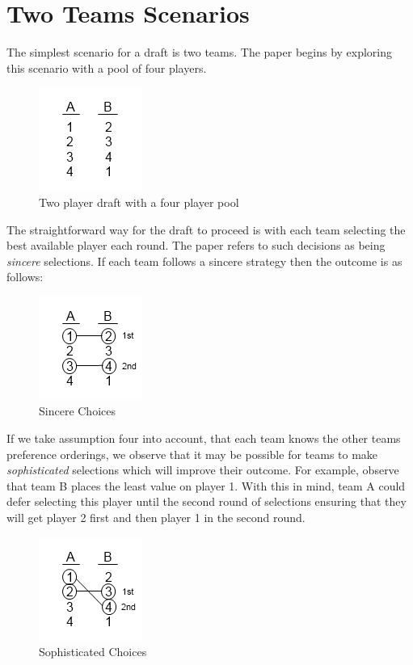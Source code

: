 \documentclass{article}
\begin{document}
\section{Two Teams Scenarios}

The simplest scenario for a draft is two teams. The paper begins by exploring this scenario with a pool of four players. 

\begin{figure}[H]
	\centering
	\includegraphics[scale=1.0]{TwoTeams}
	\caption{Two player draft with a four player pool}
\end{figure}

The straightforward way for the draft to proceed is with each team selecting the best available player each round. The paper refers to such decisions as being {\em sincere} selections. If each team follows a sincere strategy then the outcome is as follows:

\begin{figure}[H]
	\centering
	\includegraphics[scale=1.0]{TwoTeamsSincere}
	\caption{Sincere Choices}
\end{figure}

If we take assumption four into account, that each team knows the other teams preference orderings, we observe that it may be possible for teams to make {\em sophisticated} selections which will improve their outcome. For example, observe that team B places the least value on player 1. With this in mind, team A could defer selecting this player until the second round of selections ensuring that they will get player 2 first and then player 1 in the second round.

\begin{figure}[H]
	\centering
	\includegraphics[scale=1.0]{TwoTeamsSophisticated}
	\caption{Sophisticated Choices}
\end{figure}
\end{document}
